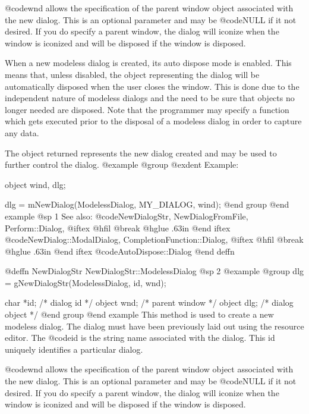 @code{wnd} allows the specification of the parent window object associated
with the new dialog.  This is an optional parameter and may be @code{NULL}
if it not desired.  If you do specify a parent window, the dialog will
iconize when the window is iconized and will be disposed if the window
is disposed.

When a new modeless dialog is created, its auto dispose mode is enabled.
This means that, unless disabled, the object representing the dialog
will be automatically disposed when the user closes the window.  This
is done due to the independent nature of modeless dialogs and the need
to be sure that objects no longer needed are disposed.  Note that the
programmer may specify a function which gets executed prior to the
disposal of a modeless dialog in order to capture any data.

The object returned represents the new dialog created and may be
used to further control the dialog.
@example
@group
@exdent Example:

object  wind, dlg;

dlg = mNewDialog(ModelessDialog, MY_DIALOG, wind);
@end group
@end example
@sp 1
See also:  @code{NewDialogStr, NewDialogFromFile, Perform::Dialog,}
@iftex
@hfil @break @hglue .63in
@end iftex
@code{NewDialog::ModalDialog, CompletionFunction::Dialog,}
@iftex
@hfil @break @hglue .63in
@end iftex
@code{AutoDispose::Dialog}
@end deffn












@deffn {NewDialogStr} NewDialogStr::ModelessDialog
@sp 2
@example
@group
dlg = gNewDialogStr(ModelessDialog, id, wnd);

char      *id;  /*  dialog id      */
object    wnd;  /*  parent window  */
object    dlg;  /*  dialog object  */
@end group
@end example
This method is used to create a new modeless dialog.  The dialog must have
been previously laid out using the resource editor.  The @code{id} is
the string name associated with the dialog.  This id uniquely identifies
a particular dialog.

@code{wnd} allows the specification of the parent window object associated
with the new dialog.  This is an optional parameter and may be @code{NULL}
if it not desired.  If you do specify a parent window, the dialog will
iconize when the window is iconized and will be disposed if the window
is disposed.

